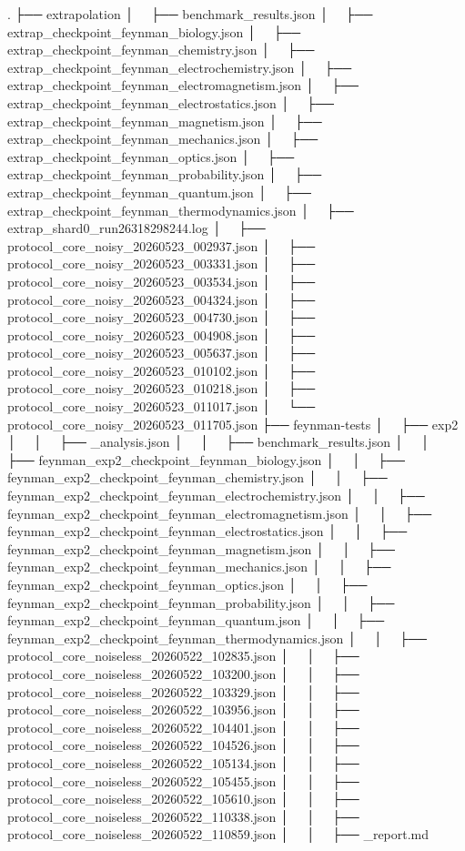 .
├── extrapolation
│   ├── benchmark_results.json
│   ├── extrap_checkpoint_feynman_biology.json
│   ├── extrap_checkpoint_feynman_chemistry.json
│   ├── extrap_checkpoint_feynman_electrochemistry.json
│   ├── extrap_checkpoint_feynman_electromagnetism.json
│   ├── extrap_checkpoint_feynman_electrostatics.json
│   ├── extrap_checkpoint_feynman_magnetism.json
│   ├── extrap_checkpoint_feynman_mechanics.json
│   ├── extrap_checkpoint_feynman_optics.json
│   ├── extrap_checkpoint_feynman_probability.json
│   ├── extrap_checkpoint_feynman_quantum.json
│   ├── extrap_checkpoint_feynman_thermodynamics.json
│   ├── extrap_shard0_run26318298244.log
│   ├── protocol_core_noisy_20260523_002937.json
│   ├── protocol_core_noisy_20260523_003331.json
│   ├── protocol_core_noisy_20260523_003534.json
│   ├── protocol_core_noisy_20260523_004324.json
│   ├── protocol_core_noisy_20260523_004730.json
│   ├── protocol_core_noisy_20260523_004908.json
│   ├── protocol_core_noisy_20260523_005637.json
│   ├── protocol_core_noisy_20260523_010102.json
│   ├── protocol_core_noisy_20260523_010218.json
│   ├── protocol_core_noisy_20260523_011017.json
│   └── protocol_core_noisy_20260523_011705.json
├── feynman-tests
│   ├── exp2
│   │   ├── _analysis.json
│   │   ├── benchmark_results.json
│   │   ├── feynman_exp2_checkpoint_feynman_biology.json
│   │   ├── feynman_exp2_checkpoint_feynman_chemistry.json
│   │   ├── feynman_exp2_checkpoint_feynman_electrochemistry.json
│   │   ├── feynman_exp2_checkpoint_feynman_electromagnetism.json
│   │   ├── feynman_exp2_checkpoint_feynman_electrostatics.json
│   │   ├── feynman_exp2_checkpoint_feynman_magnetism.json
│   │   ├── feynman_exp2_checkpoint_feynman_mechanics.json
│   │   ├── feynman_exp2_checkpoint_feynman_optics.json
│   │   ├── feynman_exp2_checkpoint_feynman_probability.json
│   │   ├── feynman_exp2_checkpoint_feynman_quantum.json
│   │   ├── feynman_exp2_checkpoint_feynman_thermodynamics.json
│   │   ├── protocol_core_noiseless_20260522_102835.json
│   │   ├── protocol_core_noiseless_20260522_103200.json
│   │   ├── protocol_core_noiseless_20260522_103329.json
│   │   ├── protocol_core_noiseless_20260522_103956.json
│   │   ├── protocol_core_noiseless_20260522_104401.json
│   │   ├── protocol_core_noiseless_20260522_104526.json
│   │   ├── protocol_core_noiseless_20260522_105134.json
│   │   ├── protocol_core_noiseless_20260522_105455.json
│   │   ├── protocol_core_noiseless_20260522_105610.json
│   │   ├── protocol_core_noiseless_20260522_110338.json
│   │   ├── protocol_core_noiseless_20260522_110859.json
│   │   ├── _report.md
